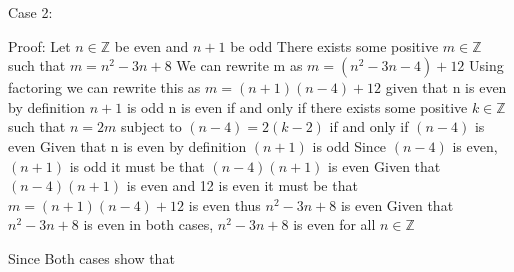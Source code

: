 \documentclass{article}
\newcommand{\bZ}{\mathbb{Z}}
\begin{document}
{\begin{enumerate}[labelindent=0pt,leftmargin=0pt]
Case 2:

Proof: Let $n\in\bZ$ be even and $n+1$ be odd
There exists some positive $m\in\bZ$ such that $ m = n^2-3n+8$ 
We can rewrite m as $m = (n^2-3n-4)+12$ 
Using factoring we can rewrite this as $m = (n+1)(n-4)+12$
given that n is even by definition $n+1$ is odd
n is even if and only if there exists some positive $k\in\bZ$ such that  $n=2m$ subject to $(n-4) = 2(k-2)$ if and only if $(n-4)$ is even 
Given that n is even by definition $(n+1)$ is odd 
Since $(n-4)$ is even, $(n+1)$ is odd it must be that $(n-4)(n+1)$ is even 
Given that $(n-4)(n+1)$ is even and 12 is even it must be that $m = (n+1)(n-4)+12$ is even thus $n^2-3n+8$ is even
Given that  $n^2-3n+8$ is even in both cases, $n^2-3n+8$ is even for all $n\in\bZ$ 

Since Both cases show that 


\end{enumerate}
}
\end{document}
